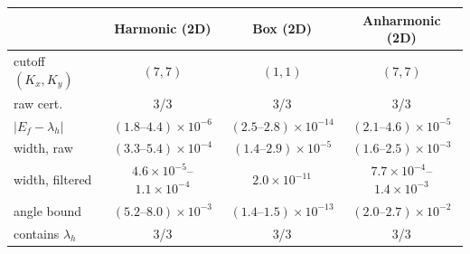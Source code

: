 \footnotesize
\setlength{\tabcolsep}{2pt}
\begin{tabular}{lccc}
\toprule
 & Harmonic (2D) & Box (2D) & Anharmonic (2D) \\
\midrule
cutoff $(K_x,K_y)$ & $(7,7)$ & $(1,1)$ & $(7,7)$ \\
raw cert. & 3/3 & 3/3 & 3/3 \\
$|E_f-\lambda_h|$ & $(1.8\text{--}4.4)\times10^{-6}$ & $(2.5\text{--}2.8)\times10^{-14}$ & $(2.1\text{--}4.6)\times10^{-5}$ \\
width, raw & $(3.3\text{--}5.4)\times10^{-4}$ & $(1.4\text{--}2.9)\times10^{-5}$ & $(1.6\text{--}2.5)\times10^{-3}$ \\
width, filtered & $4.6\times10^{-5}$--$1.1\times10^{-4}$ & $2.0\times10^{-11}$ & $7.7\times10^{-4}$--$1.4\times10^{-3}$ \\
angle bound & $(5.2\text{--}8.0)\times10^{-3}$ & $(1.4\text{--}1.5)\times10^{-13}$ & $(2.0\text{--}2.7)\times10^{-2}$ \\
contains $\lambda_h$ & 3/3 & 3/3 & 3/3 \\
\bottomrule
\end{tabular}
